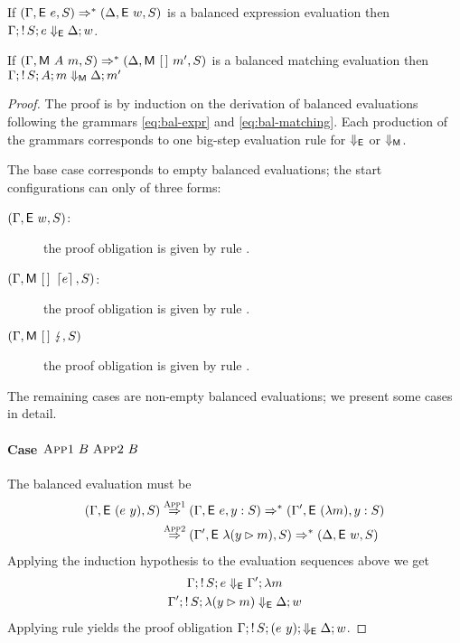 \begin{theorem}
  If $(\Gamma, \textsf{E}~e, S) \Rightarrow^{*} (\Delta, \textsf{E}~w,
  S)$ is a balanced expression evaluation then
  $\Gamma;\mathop{!}{S}; e \Downarrow_{\textsf{E}} \Delta; w$.

  If $(\Gamma, \textsf{M}~A~m, S) \Rightarrow^{*} (\Delta,
  \textsf{M}~[\,]~m', S)$ is a balanced matching evaluation then
  $\Gamma;\mathop{!}{S}; A;m \Downarrow_{\textsf{M}} \Delta;m'$
\end{theorem}

\begin{proof}
  The proof is by induction on the derivation of balanced evaluations
  following the grammars \eqref{eq:bal-expr} and
  \eqref{eq:bal-matching}.  Each production of the grammars corresponds
  to one big-step evaluation rule for $\Downarrow_{\textsf{E}}$ or $\Downarrow_{\textsf{M}}$.

  The base case corresponds to empty balanced evaluations;
  the start configurations can only of three forms:
  \begin{description}
  \item[$(\Gamma, \textsf{E}~w, S)$:]
    the proof obligation is given by rule .
  \item [$(\Gamma, \textsf{M}~[\,]~\left\lceil e\right\rceil, S)$:]
    the proof obligation is given by rule .
  \item [$(\Gamma, \textsf{M}~[\,]~\lightning, S)$]
    the proof obligation is given by rule .
  \end{description}

  The remaining cases are non-empty balanced evaluations; we present
  some cases in detail.
  
  \paragraph{Case $\textsc{App1}~B~\textsc{App2}~B$}
  The balanced evaluation must be
  \[
    \begin{split}
      (\Gamma,\textsf{E}~(e~y), S) & \stackrel{\textsc{App1}}{\Rightarrow}
      (\Gamma, \textsf{E}~e, y:S) \Rightarrow^{*}
      (\Gamma', \textsf{E}~(\lambda m), y:S) \\
      & \stackrel{\textsc{App2}}{\Rightarrow}
      (\Gamma', \textsf{E}~\lambda (y\rhd m), S)
      \Rightarrow^{*} (\Delta, \textsf{E}~w, S)
    \end{split}
  \]
  Applying the induction hypothesis to the evaluation sequences above we get
  \begin{gather*}
    \Gamma;\mathop{!}{S};e \Downarrow_{\textsf{E}} \Gamma'; \lambda m \\
    \Gamma';\mathop{!}{S};\lambda(y\rhd m) \Downarrow_{\textsf{E}} \Delta;w
  \end{gather*}
  Applying rule  yields the proof obligation
  $\Gamma;\mathop{!}{S};(e~y); \Downarrow_{\textsf{E}} \Delta; w$.


\end{proof}
